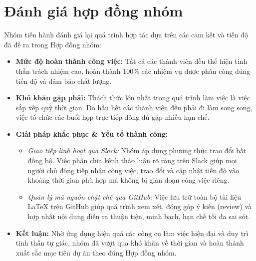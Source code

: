 \section{Đánh giá hợp đồng nhóm}

Nhóm tiến hành đánh giá lại quá trình hợp tác dựa trên các cam kết và tiến độ đã đề ra trong Hợp đồng nhóm:

\begin{itemize}
    \item \textbf{Mức độ hoàn thành công việc:} Tất cả các thành viên đều thể hiện tinh thần trách nhiệm cao, hoàn thành 100\% các nhiệm vụ được phân công đúng tiến độ và đảm bảo chất lượng.
    
    \item \textbf{Khó khăn gặp phải:} Thách thức lớn nhất trong quá trình làm việc là việc sắp xếp quỹ thời gian. Do hầu hết các thành viên đều phải đi làm song song, việc tổ chức các buổi họp trực tiếp đông đủ gặp nhiều hạn chế.
    
    \item \textbf{Giải pháp khắc phục \& Yếu tố thành công:}
    \begin{itemize}
        \item \textit{Giao tiếp linh hoạt qua Slack:} Nhóm áp dụng phương thức trao đổi bất đồng bộ. Việc phân chia kênh thảo luận rõ ràng trên Slack giúp mọi người chủ động tiếp nhận công việc, trao đổi và cập nhật tiến độ vào khoảng thời gian phù hợp mà không bị gián đoạn công việc riêng.
        \item \textit{Quản lý mã nguồn chặt chẽ qua GitHub:} Việc lưu trữ toàn bộ tài liệu \LaTeX{} trên GitHub giúp quá trình xem xét, đóng góp ý kiến (review) và hợp nhất nội dung diễn ra thuận tiện, minh bạch, hạn chế tối đa sai sót.
    \end{itemize}
    
    \item \textbf{Kết luận:} Nhờ ứng dụng hiệu quả các công cụ làm việc hiện đại và duy trì tinh thần tự giác, nhóm đã vượt qua khó khăn về thời gian và hoàn thành xuất sắc mục tiêu dự án theo đúng Hợp đồng nhóm.
\end{itemize}
